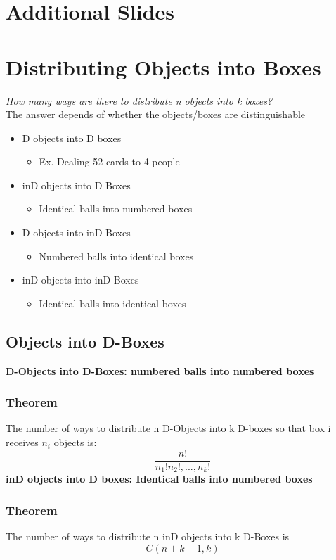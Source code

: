 \documentclass{article}[18pt]
\begin{document}
\section{Additional Slides}
\section{Distributing Objects into Boxes}
\textit{How many ways are there to distribute n objects into k boxes?}\\
The answer depends of whether the objects/boxes are distinguishable
\begin{itemize}
\item D objects into D boxes
\begin{itemize}
\item Ex. Dealing 52 cards to 4 people
\end{itemize}

\item inD objects into D Boxes
\begin{itemize}
\item Identical balls into numbered boxes
\end{itemize}

\item D objects into inD Boxes
\begin{itemize}
\item Numbered balls into identical boxes
\end{itemize}

\item inD objects into inD Boxes
\begin{itemize}
\item Identical balls into identical boxes
\end{itemize}

\end{itemize}
\subsection{Objects into D-Boxes}
\textbf{D-Objects into D-Boxes: numbered balls into numbered boxes}\subsubsection{Theorem}
The number of ways to distribute n D-Objects into k D-boxes so that box i receives $n_i$ objects is:
$$\dfrac{n!}{n_1!n_2!,...,n_k!}$$
\textbf{inD objects into D boxes: Identical balls into numbered boxes}
\subsubsection{Theorem}
The number of ways to distribute n inD objects into k D-Boxes is
$$C(n+k-1,k)$$
\end{document}
